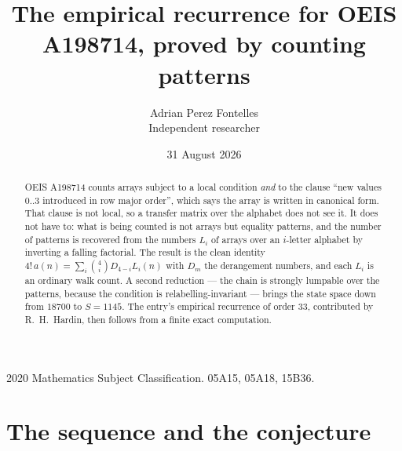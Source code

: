 \documentclass[11pt,a4paper]{article}
\title{The empirical recurrence for OEIS A198714, proved by counting patterns}
\author{Adrian Perez Fontelles\\ \small Independent researcher}
\date{31 August 2026}
\theoremstyle{plain}
\theoremstyle{definition}
\begin{document}
\maketitle

\begin{abstract}
OEIS A198714 counts arrays subject to a local condition \emph{and} to the clause ``new values
$0..3$ introduced in row major order'', which says the array is written in canonical
form. That clause is not local, so a transfer matrix over the alphabet does not see it. It
does not have to: what is being counted is not arrays but equality patterns, and the number
of patterns is recovered from the numbers $L_i$ of arrays over an $i$-letter alphabet by
inverting a falling factorial. The result is the clean identity
$4!\,a(n)=\sum_i\binom{4}{i}D_{4-i}L_i(n)$ with $D_m$ the derangement numbers,
and each $L_i$ is an ordinary walk count. A second reduction --- the chain is strongly
lumpable over the patterns, because the condition is relabelling-invariant --- brings the
state space down from $18700$ to $S=1145$. The entry's empirical recurrence of order
$33$, contributed by R.~H.~Hardin, then follows from a finite exact computation.
\end{abstract}

\noindent\small 2020 Mathematics Subject Classification. 05A15, 05A18, 15B36.\normalsize

\section{The sequence and the conjecture}
\end{document}
